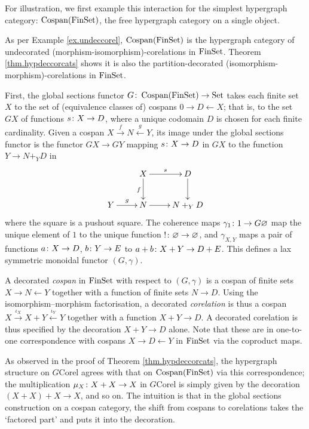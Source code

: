 For illustration, we first example this interaction for the simplest hypergraph
category: $\operatorname{{Cospan}}(\mathrm{FinSet})$, the free hypergraph category on a single object.

\begin{example}
  As per Example \ref{ex.undeccorel}, $\operatorname{{Cospan}}(\mathrm{FinSet})$ is the hypergraph
  category of undecorated (morphism-isomorphism)-corelations in $\mathrm{FinSet}$.
  Theorem \ref{thm.hypdeccorcats} shows it is also the partition-decorated
  (isomorphism-morphism)-corelations in $\mathrm{FinSet}$.   
  
  First, the global sections functor $G{\colon} \operatorname{{Cospan}}(\mathrm{FinSet}) \to \mathrm{Set}$ takes
  each finite set $X$ to the set of (equivalence classes of) cospans $0 \to D
  \leftarrow X$; that is, to the set $GX$ of functions $s{\colon} X \to D$, where a
  unique codomain $D$ is chosen for each finite cardinality. Given a cospan $X
  \stackrel{f}\to N \stackrel{g}\leftarrow Y$, its image under the global
  sections functor is the functor $GX \to GY$ mapping $s{\colon} X \to D$ in $GX$
  to the function $Y \to N+_YD$ in
  \[
    \xymatrix{
      & X \ar[r]^s \ar[d]_f & D \ar[d] \\
      Y \ar[r]^g  & N \ar[r] & N+_YD
    }
  \]
  where the square is a pushout square. The coherence maps $\gamma_1{\colon} 1 \to
  G\varnothing$ map the unique element of $1$ to the unique function $!{\colon}
  \varnothing \to \varnothing$, and $\gamma_{X,Y}$ maps a pair of functions
  $a{\colon} X \to D$, $b{\colon} Y \to E$ to $a+b{\colon} X+Y \to D+E$. This defines a
  lax symmetric monoidal functor $(G,\gamma)$.

  A decorated \emph{cospan} in $\mathrm{FinSet}$ with respect to $(G,\gamma)$ is a cospan of
  finite sets $X \to N \leftarrow Y$ together with a function of finite sets $N
  \to D$. Using the isomorphism--morphism factorisation, a decorated
  \emph{corelation} is thus a cospan $X \xrightarrow{\iota_X} X+Y
  \xleftarrow{\iota_Y} Y$ together with a function $X+Y \to D$. A decorated
  corelation is thus specified by the decoration $X+Y \to D$ alone. Note that
  these are in one-to-one correspondence with cospans $X \to D \leftarrow Y$ in
  $\mathrm{FinSet}$ via the coproduct maps.

  As observed in the proof of Theorem \ref{thm.hypdeccorcats}, the hypergraph
  structure on $G\mathrm{Corel}$ agrees with that on $\operatorname{{Cospan}}(\mathrm{FinSet})$ via
  this correspondence; the multiplication $\mu_X{\colon} X+X \to X$ in
  $G\mathrm{Corel}$ is simply given by the decoration $(X+X)+X \to X$, and so
  on. The intuition is that in the global sections construction on a cospan
  category, the shift from cospans to corelations takes the `factored part'
  and puts it into the decoration. 


\end{example}
